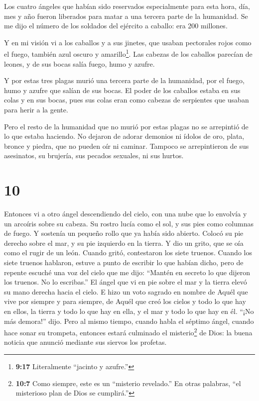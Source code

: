  Los cuatro ángeles que habían sido reservados
especialmente para esta hora, día, mes y año fueron liberados para matar
a una tercera parte de la humanidad.  Se me dijo el número
de los soldados del ejército a caballo: era 200 millones.

 Y en mi visión vi a los caballos y a sus jinetes, que
usaban pectorales rojos como el fuego, también azul oscuro y
amarillo\footnote{\textbf{9:17} Literalmente ``jacinto y azufre.''}. Las
cabezas de los caballos parecían de leones, y de sus bocas salía fuego,
humo y azufre.

 Y por estas tres plagas murió una tercera parte de la
humanidad, por el fuego, humo y azufre que salían de sus bocas.
 El poder de los caballos estaba en sus colas y en sus
bocas, pues sus colas eran como cabezas de serpientes que usaban para
herir a la gente.

 Pero el resto de la humanidad que no murió por estas
plagas no se arrepintió de lo que estaba haciendo. No dejaron de adorar
demonios ni ídolos de oro, plata, bronce y piedra, que no pueden oír ni
caminar.  Tampoco se arrepintieron de sus asesinatos, su
brujería, sus pecados sexuales, ni sus hurtos.

\hypertarget{section-9}{%
\section{10}\label{section-9}}

 Entonces vi a otro ángel descendiendo del cielo, con una
nube que lo envolvía y un arcoíris sobre su cabeza. Su rostro lucía como
el sol, y sus pies como columnas de fuego.  Y sostenía un
pequeño rollo que ya había sido abierto. Colocó su pie derecho sobre el
mar, y su pie izquierdo en la tierra.  Y dio un grito, que
se oía como el rugir de un león. Cuando gritó, contestaron los siete
truenos.  Cuando los siete truenos hablaron, estuve a punto
de escribir lo que habían dicho, pero de repente escuché una voz del
cielo que me dijo: ``Mantén en secreto lo que dijeron los truenos. No lo
escribas.''  El ángel que vi en pie sobre el mar y la tierra
elevó su mano derecha hacia el cielo.  E hizo un voto
sagrado en nombre de Aquél que vive por siempre y para siempre, de Aquél
que creó los cielos y todo lo que hay en ellos, la tierra y todo lo que
hay en ella, y el mar y todo lo que hay en él. ``¡No más demora!'' dijo.
 Pero al mismo tiempo, cuando habla el séptimo ángel, cuando
hace sonar su trompeta, entonces estará culminado el misterio\footnote{\textbf{10:7}
  Como siempre, este es un ``misterio revelado.'' En otras palabras,
  ``el misterioso plan de Dios se cumplirá.''} de Dios: la buena noticia
que anunció mediante sus siervos los profetas.

